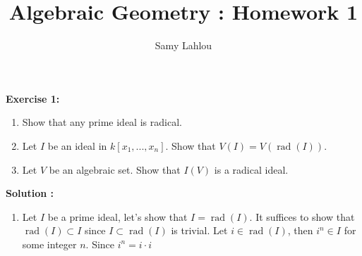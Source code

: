 \documentclass{article}
\title{Algebraic Geometry : Homework 1}
\author{Samy Lahlou}
\date{}
\DeclareMathOperator{\rad}{rad}
\begin{document}
\maketitle

\noindent \textbf{Exercise 1:}
\begin{enumerate}[label=(\alph*)]
    \item Show that any prime ideal is radical.
    \item Let $I$ be an ideal in $k[x_1, ..., x_n]$. Show that $V(I) = V(\rad(I))$.
    \item Let $V$ be an algebraic set. Show that $I(V)$ is a radical ideal.
\end{enumerate}

\noindent \textbf{Solution :}
\begin{enumerate}[label=(\alph*)]
    \item Let $I$ be a prime ideal, let's show that $I = \rad(I)$. It suffices to show that $\rad(I) \subset I$ since $I \subset \rad(I)$ is trivial. Let $i \in \rad(I)$, then $i^n \in I$ for some integer $n$. Since $i^n = i\cdot i^{}$
\end{enumerate}
\end{document}

